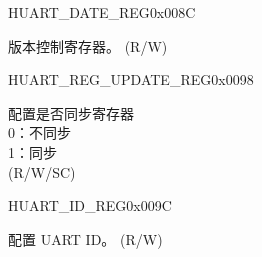 \begin{register}{H}{UART\_DATE\_REG}{0x008C}\label{regdesc:UARTDATEREG}
%
\regnewline%
\begin{regdesc}\begin{reglist}
\label{fielddesc:UARTDATE}\item [UART\_DATE] 版本控制寄存器。 (R/W)
\end{reglist}\end{regdesc}
\end{register}


\begin{register}{H}{UART\_REG\_UPDATE\_REG}{0x0098}\label{regdesc:UARTREGUPDATEREG}
%
%
\regnewline%
\begin{regdesc}\begin{reglist}
\label{fielddesc:UARTREGUPDATE}\item [UART\_REG\_UPDATE] 配置是否同步寄存器\\
0：不同步\\
1：同步\\(R/W/SC)
\end{reglist}\end{regdesc}
\end{register}


\begin{register}{H}{UART\_ID\_REG}{0x009C}\label{regdesc:UARTIDREG}
%
\regnewline%
\begin{regdesc}\begin{reglist}
\label{fielddesc:UARTID}\item [UART\_ID] 配置 UART ID。 (R/W)
\end{reglist}\end{regdesc}
\end{register}


